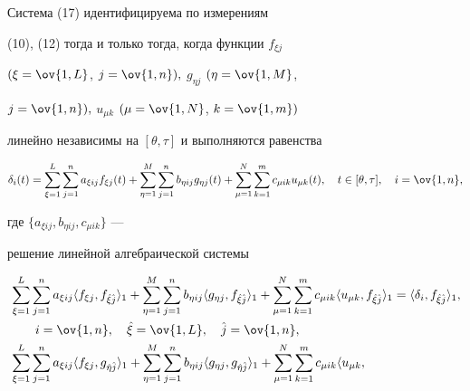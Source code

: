 \begin{cor} Система (17) идентифицируема по измерениям


(10), (12) тогда и только тогда, когда функции $f_{\xi j}$


$(\xi=\ov{1,L}$, $j=\ov{1,n}),$ $g_{\eta j}$ $(\eta=\ov{1,M}$,


$j=\ov{1,n}),$ $u_{\mu k}$ $(\mu=\ov{1,N}$, $k=\ov{1,m})$


линейно независимы на $[\theta,\tau]$ и выполняются равенства


$$


\delta_i(t)=\sum_{\xi=1}^L \sum_{j=1}^n a_{\xi ij}f_{\xi j}(t) +


\sum_{\eta=1}^M \sum_{j=1}^n b_{\eta ij}g_{\eta j}(t) +


\sum_{\mu=1}^N \sum_{k=1}^m c_{\mu ik}u_{\mu k}(t),\quad


t\in[\theta,\tau],\quad i=\ov{1,n},


$$


где $\{a_{\xi ij}, b_{\eta ij}, c_{\mu ik}\}$ ---


решение линейной алгебраической системы


\begin{align*}


&\sum_{\xi=1}^L \sum_{j=1}^n a_{\xi ij}\la f_{\xi j},


f_{\Hat\xi\Hat j}\ra_1 +


\sum_{\eta=1}^M \sum_{j=1}^n b_{\eta ij}\la g_{\eta j},


f_{\Hat\xi\Hat j}\ra_1 +


\sum_{\mu=1}^N \sum_{k=1}^m c_{\mu ik}\la u_{\mu k},


f_{\Hat\xi\Hat j}\ra_1 =\la \delta_i,


f_{\Hat\xi\Hat j}\ra_1,\\


&\qquad i=\ov{1,n},\quad


\Hat\xi=\ov{1,L},\quad


\Hat j=\ov{1,n},\\


%


&\sum_{\xi=1}^L \sum_{j=1}^n a_{\xi ij}\la f_{\xi j},


g_{\Hat\eta\Hat j}\ra_1 +


\sum_{\eta=1}^M \sum_{j=1}^n b_{\eta ij}\la g_{\eta j},


g_{\Hat\eta\Hat j}\ra_1 +


\sum_{\mu=1}^N \sum_{k=1}^m c_{\mu ik}\la u_{\mu k},



\end{align*}
\end{cor}
